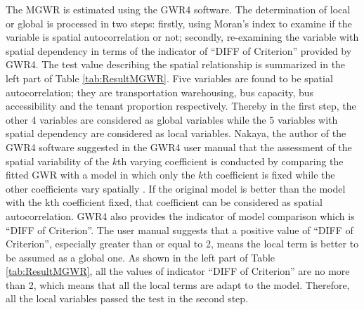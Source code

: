 \documentclass[utf8]{article}
\begin{document}
%
The MGWR is estimated using the GWR4 software. The determination of local or global is processed in two steps: firstly, using Moran’s index to examine if the variable is spatial autocorrelation or not; secondly, re-examining the variable with spatial dependency in terms of the indicator of “DIFF of Criterion” provided by GWR4. The test value describing the spatial relationship is summarized in the left part of Table \ref{tab:ResultMGWR}. Five variables are found to be spatial autocorrelation; they are transportation warehousing, bus capacity, bus accessibility and the tenant proportion respectively. Thereby in the first step, the other 4 variables are considered as global variables while the 5 variables with spatial dependency are considered as local variables. Nakaya, the author of the GWR4 software suggested in the GWR4 user manual that the assessment of the spatial variability of the $k$th varying coefficient is conducted by comparing the fitted GWR with a model in which only the $k$th coefficient is fixed while the other coefficients vary spatially \cite{Nakaya2012}. If the original model is better than the model with the kth coefficient fixed, that coefficient can be considered as spatial autocorrelation. GWR4 also provides the indicator of model comparison which is “DIFF of Criterion”. The user manual suggests that a positive value of “DIFF of Criterion”, especially greater than or equal to 2, means the local term is better to be assumed as a global one. As shown in the left part of Table \ref{tab:ResultMGWR}, all the values of indicator “DIFF of Criterion” are no more than 2, which means that all the local terms are adapt to the model. Therefore, all the local variables passed the test in the second step.
\end{document}

